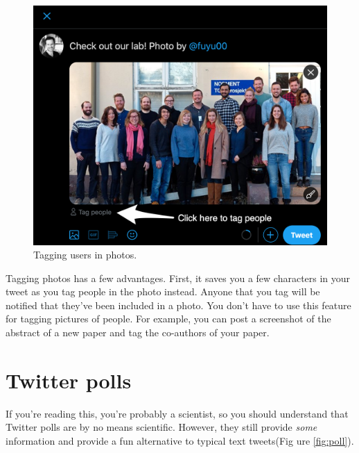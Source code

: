 \documentclass[]{book}
\begin{document}
\begin{figure}

{\centering \includegraphics[width=0.8\linewidth]{images/tag} 

}

\caption{Tagging users in photos.}\label{fig:tag}
\end{figure}

Tagging photos has a few advantages. First, it saves you a few characters in your tweet as you tag people in the photo instead. Anyone that you tag will be notified that they've been included in a photo. You don't have to use this feature for tagging pictures of people. For example, you can post a screenshot of the abstract of a new paper and tag the co-authors of your paper.

\hypertarget{twitter-polls}{%
\section{Twitter polls}\label{twitter-polls}}

If you're reading this, you're probably a scientist, so you should understand that Twitter polls are by no means scientific. However, they still provide \emph{some} information and provide a fun alternative to typical text tweets(Fig ure \ref{fig:poll}).
\end{document}
